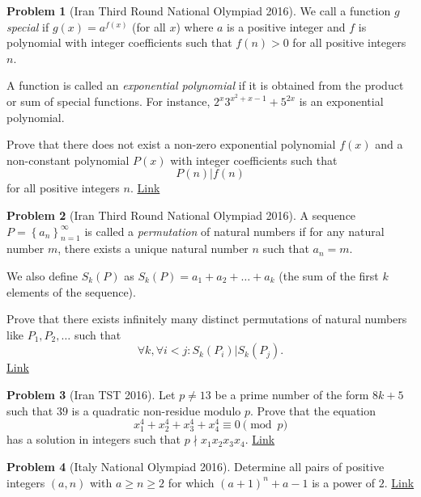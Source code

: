 \documentclass[]{article}
\theoremstyle{definition}
\newtheorem{problem}{Problem}
\begin{document}
\begin{problem}[Iran Third Round National Olympiad 2016]
	We call a function $g$ \textit{special} if $g(x)=a^{f(x)}$ (for all $x$) where $a$ is a positive integer and $f$ is polynomial with integer coefficients such that $f(n)>0$ for all positive integers $n$.
	
	A function is called an \textit{exponential polynomial} if it is obtained from the product or sum of special functions. For instance, $2^{x}3^{x^{2}+x-1}+5^{2x}$ is an exponential polynomial.
	
	Prove that there does not exist a non-zero exponential polynomial $f(x)$ and a non-constant polynomial $P(x)$ with integer coefficients such that
	$$P(n)|f(n)$$for all positive integers $n$. \hfill \href{http://artofproblemsolving.com/community/c6h1300987p6930211}{Link}
\end{problem}




\begin{problem}[Iran Third Round National Olympiad 2016]
	A sequence $P=\left \{ a_{n} \right \}_{n=1}^{\infty}$ is called a \textit{permutation} of natural numbers if for any natural number $m$, there exists a unique natural number $n$ such that $a_n=m.$
	
	We also define $S_k(P)$ as
	$S_k(P)=a_{1}+a_{2}+\dots +a_{k}$ (the sum of the first $k$ elements of the sequence).
	
	Prove that there exists infinitely many distinct permutations of natural numbers like $P_1,P_2, \dots$ such that
	$$\forall k, \forall i<j: S_k(P_i)|S_k(P_j).$$
	\flushright \href{http://artofproblemsolving.com/community/c6h1300990p6930248}{Link}
\end{problem}




\begin{problem}[Iran TST 2016]
	Let $p \neq 13$ be a prime number of the form $8k+5$ such that $39$ is a quadratic non-residue modulo $p$. Prove that the equation $$x_1^4+x_2^4+x_3^4+x_4^4 \equiv 0 \pmod p$$ has a solution in integers such that $p\nmid x_1x_2x_3x_4$. \hfill \href{http://artofproblemsolving.com/community/c6h1272976p6661198}{Link}
\end{problem}




\begin{problem}[Italy National Olympiad 2016]
	Determine all pairs of positive integers $(a,n)$ with $a\ge n\ge 2$ for which $(a+1)^n+a-1$ is a power of $2$. \hfill \href{http://artofproblemsolving.com/community/c6h1241079p6338542}{Link}
\end{problem}
\end{document}
